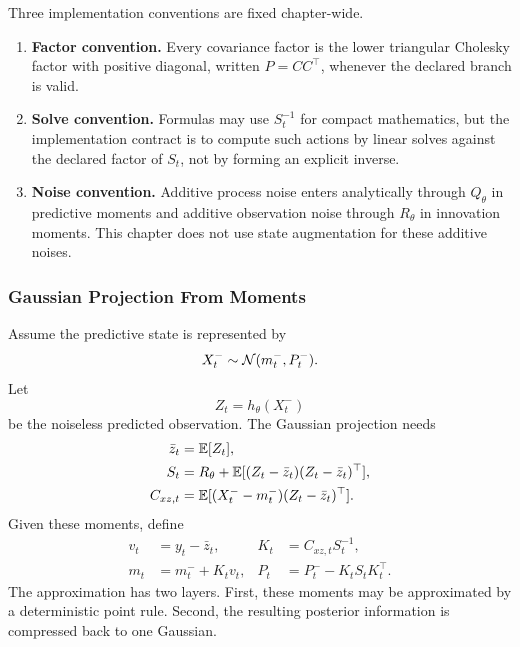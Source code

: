 Three implementation conventions are fixed chapter-wide.
\begin{enumerate}[leftmargin=0.28in]
  \item \textbf{Factor convention.}  Every covariance factor is the lower
  triangular Cholesky factor with positive diagonal, written \(P=CC^\top\),
  whenever the declared branch is valid.
  \item \textbf{Solve convention.}  Formulas may use \(S_t^{-1}\) for compact
  mathematics, but the implementation contract is to compute such actions by
  linear solves against the declared factor of \(S_t\), not by forming an
  explicit inverse.
  \item \textbf{Noise convention.}  Additive process noise enters analytically
  through \(Q_\theta\) in predictive moments and additive observation noise
  through \(R_\theta\) in innovation moments.  This chapter does not use state
  augmentation for these additive noises.
\end{enumerate}

\subsubsection{Gaussian Projection From Moments}
\label{sec:bf-hd-gq-projection}

Assume the predictive state is represented by
\begin{equation}
  X_t^-\sim\mathcal{N}(m_t^-,P_t^-).
  \label{eq:bf-hd-gq-predictive-gaussian}
\end{equation}
Let
\begin{equation}
  Z_t=h_\theta(X_t^-)
  \label{eq:bf-hd-gq-predicted-observation}
\end{equation}
be the noiseless predicted observation.  The Gaussian projection needs
\begin{align}
  \bar z_t &= \mathbb{E}[Z_t],
  \label{eq:bf-hd-gq-zbar}\\
  S_t &= R_\theta+\mathbb{E}[(Z_t-\bar z_t)(Z_t-\bar z_t)^\top],
  \label{eq:bf-hd-gq-S}\\
  C_{xz,t}&=\mathbb{E}[(X_t^- -m_t^-)(Z_t-\bar z_t)^\top].
  \label{eq:bf-hd-gq-Cxz}
\end{align}
Given these moments, define
\begin{align}
  v_t&=y_t-\bar z_t,
  &
  K_t&=C_{xz,t}S_t^{-1},
  \label{eq:bf-hd-gq-v-K}\\
  m_t&=m_t^-+K_tv_t,
  &
  P_t&=P_t^- - K_tS_tK_t^\top.
  \label{eq:bf-hd-gq-projection-update}
\end{align}
The approximation has two layers.  First, these moments may be approximated by a
deterministic point rule.  Second, the resulting posterior information is
compressed back to one Gaussian.

